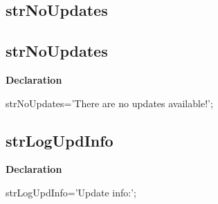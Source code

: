 \documentclass{report}
\newif\ifpdf
\begin{document}
\subsection*{\large{\textbf{strNoUpdates}}\normalsize\hspace{1ex}\hrulefill}
\else
\subsection*{strNoUpdates}
\fi
\label{trstrings-strNoUpdates}
\begin{list}{}{
\setlength{\itemindent}{0cm}
\setlength{\listparindent}{0cm}
\setlength{\leftmargin}{\evensidemargin}
\addtolength{\leftmargin}{\tmplength}
\settowidth{\labelsep}{X}
\addtolength{\leftmargin}{\labelsep}
\setlength{\labelwidth}{\tmplength}
}
\item[\textbf{Declaration}\hfill]
\ifpdf
\begin{flushleft}
\fi
\begin{ttfamily}
strNoUpdates='There are no updates available!';\end{ttfamily}

\ifpdf
\end{flushleft}
\fi

\end{list}
\ifpdf
\subsection*{\large{\textbf{strLogUpdInfo}}\normalsize\hspace{1ex}\hrulefill}
\else
\subsection*{strLogUpdInfo}
\fi
\label{trstrings-strLogUpdInfo}
\begin{list}{}{
\setlength{\itemindent}{0cm}
\setlength{\listparindent}{0cm}
\setlength{\leftmargin}{\evensidemargin}
\addtolength{\leftmargin}{\tmplength}
\settowidth{\labelsep}{X}
\addtolength{\leftmargin}{\labelsep}
\setlength{\labelwidth}{\tmplength}
}
\item[\textbf{Declaration}\hfill]
\ifpdf
\begin{flushleft}
\fi
\begin{ttfamily}
strLogUpdInfo='Update info:';\end{ttfamily}

\ifpdf
\end{flushleft}
\fi

\end{list}
\ifpdf
\end{document}
